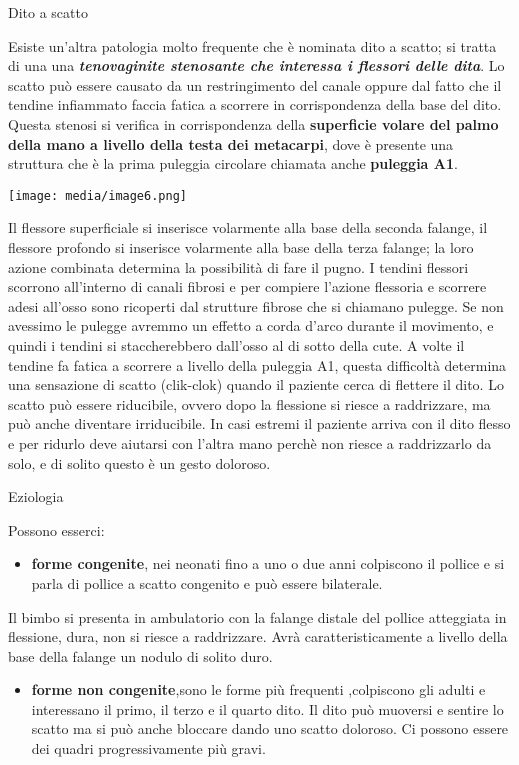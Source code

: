 \documentclass[]{article}
\begin{document}
Dito a scatto

Esiste un'altra patologia molto frequente che è nominata dito a scatto;
si tratta di una una \textbf{\emph{tenovaginite stenosante che interessa
i flessori delle dita}}. Lo scatto può essere causato da un
restringimento del canale oppure dal fatto che il tendine infiammato
faccia fatica a scorrere in corrispondenza della base del dito. Questa
stenosi si verifica in corrispondenza della \textbf{superficie volare
del palmo della mano a livello della testa dei metacarpi}, dove è
presente una struttura che è la prima puleggia circolare chiamata anche
\textbf{puleggia A1}.

\texttt{[image: media/image6.png]}

Il flessore superficiale si inserisce volarmente alla base della seconda
falange, il flessore profondo si inserisce volarmente alla base della
terza falange; la loro azione combinata determina la possibilità di fare
il pugno. I tendini flessori scorrono all'interno di canali fibrosi e
per compiere l'azione flessoria e scorrere adesi all'osso sono ricoperti
dal strutture fibrose che si chiamano pulegge. Se non avessimo le
pulegge avremmo un effetto a corda d'arco durante il movimento, e quindi
i tendini si staccherebbero dall'osso al di sotto della cute. A volte il
tendine fa fatica a scorrere a livello della puleggia A1, questa
difficoltà determina una sensazione di scatto (clik-clok) quando il
paziente cerca di flettere il dito. Lo scatto può essere riducibile,
ovvero dopo la flessione si riesce a raddrizzare, ma può anche diventare
irriducibile. In casi estremi il paziente arriva con il dito flesso e
per ridurlo deve aiutarsi con l'altra mano perchè non riesce a
raddrizzarlo da solo, e di solito questo è un gesto doloroso.

Eziologia

Possono esserci:

\begin{itemize}
\item
  \textbf{forme congenite}, nei neonati fino a uno o due anni colpiscono
  il pollice e si parla di pollice a scatto congenito e può essere
  bilaterale.
\end{itemize}

Il bimbo si presenta in ambulatorio con la falange distale del pollice
atteggiata in flessione, dura, non si riesce a raddrizzare. Avrà
caratteristicamente a livello della base della falange un nodulo di
solito duro.

\begin{itemize}
\item
  \textbf{forme non congenite},sono le forme più frequenti ,colpiscono
  gli adulti e interessano il primo, il terzo e il quarto dito. Il dito
  può muoversi e sentire lo scatto ma si può anche bloccare dando uno
  scatto doloroso. Ci possono essere dei quadri progressivamente più
  gravi.
\end{itemize}
\end{document}
